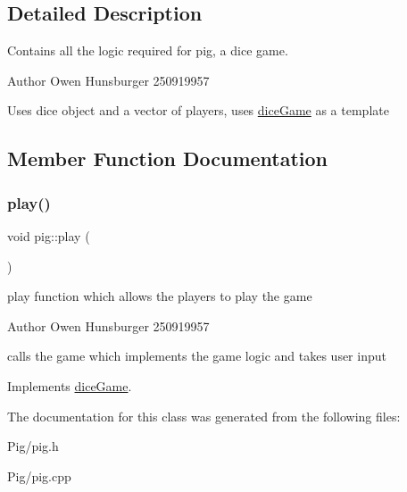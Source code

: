 \subsection{Detailed Description}
Contains all the logic required for pig, a dice game. 

\begin{DoxyAuthor}{Author}
Owen Hunsburger 250919957
\end{DoxyAuthor}
Uses dice object and a vector of players, uses \hyperlink{classdiceGame}{dice\+Game} as a template 

\subsection{Member Function Documentation}
\mbox{\label{classpig_a83fd8571e2f33ec33f6fafd7efa96571}} 
\subsubsection{\texorpdfstring{play()}{play()}}
{\footnotesize\ttfamily void pig\+::play (\begin{DoxyParamCaption}{ }\end{DoxyParamCaption})\hspace{0.3cm}{\ttfamily [virtual]}}



play function which allows the players to play the game 

\begin{DoxyAuthor}{Author}
Owen Hunsburger 250919957
\end{DoxyAuthor}
calls the game which implements the game logic and takes user input 

Implements \hyperlink{classdiceGame_a0620d98347df4779fa620b3b3e239d4e}{dice\+Game}.



The documentation for this class was generated from the following files\+:\begin{DoxyCompactItemize}
\item 
Pig/pig.\+h\item 
Pig/pig.\+cpp\end{DoxyCompactItemize}
